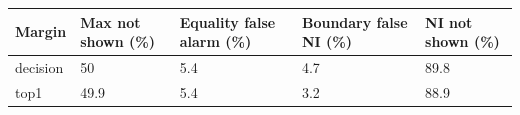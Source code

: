 \begin{tabular}{lllll}
\toprule
Margin & Max not shown (\%) & Equality false alarm (\%) & Boundary false NI (\%) & NI not shown (\%) \\
\midrule
decision & 50 & 5.4 & 4.7 & 89.8 \\
top1 & 49.9 & 5.4 & 3.2 & 88.9 \\
\bottomrule
\end{tabular}
